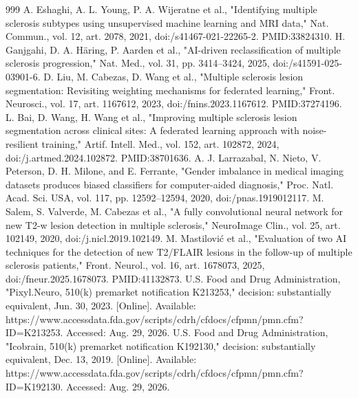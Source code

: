 \documentclass[journal,twoside,web]{ieeecolor}
\begin{document}
\begin{thebibliography}{999}
 A. Eshaghi, A. L. Young, P. A. Wijeratne et al., "Identifying multiple sclerosis subtypes using unsupervised machine learning and MRI data," Nat. Commun., vol. 12, art. 2078, 2021, doi:/\allowbreak s41467-021-22265-2. PMID:33824310.
 H. Ganjgahi, D. A. Häring, P. Aarden et al., "AI-driven reclassification of multiple sclerosis progression," Nat. Med., vol. 31, pp. 3414--3424, 2025, doi:/\allowbreak s41591-025-03901-6.
 D. Liu, M. Cabezas, D. Wang et al., "Multiple sclerosis lesion segmentation: Revisiting weighting mechanisms for federated learning," Front. Neurosci., vol. 17, art. 1167612, 2023, doi:/\allowbreak fnins.2023.1167612. PMID:37274196.
 L. Bai, D. Wang, H. Wang et al., "Improving multiple sclerosis lesion segmentation across clinical sites: A federated learning approach with noise-resilient training," Artif. Intell. Med., vol. 152, art. 102872, 2024, doi:/\allowbreak j.artmed.2024.102872. PMID:38701636.
 A. J. Larrazabal, N. Nieto, V. Peterson, D. H. Milone, and E. Ferrante, "Gender imbalance in medical imaging datasets produces biased classifiers for computer-aided diagnosis," Proc. Natl. Acad. Sci. USA, vol. 117, pp. 12592--12594, 2020, doi:/\allowbreak pnas.1919012117.
 M. Salem, S. Valverde, M. Cabezas et al., "A fully convolutional neural network for new T2-w lesion detection in multiple sclerosis," NeuroImage Clin., vol. 25, art. 102149, 2020, doi:/\allowbreak j.nicl.2019.102149.
 M. Mastilović et al., "Evaluation of two AI techniques for the detection of new T2/\allowbreak FLAIR lesions in the follow-up of multiple sclerosis patients," Front. Neurol., vol. 16, art. 1678073, 2025, doi:/\allowbreak fneur.2025.1678073. PMID:41132873.
 U.S. Food and Drug Administration, "Pixyl.Neuro, 510(k) premarket notification K213253," decision: substantially equivalent, Jun. 30, 2023. [Online]. Available: https:/\allowbreak /\allowbreak \allowbreak www.accessdata.fda.gov/\allowbreak scripts/\allowbreak cdrh/\allowbreak cfdocs/\allowbreak cfpmn/\allowbreak pmn.cfm?ID=K213253. Accessed: Aug. 29, 2026.
 U.S. Food and Drug Administration, "Icobrain, 510(k) premarket notification K192130," decision: substantially equivalent, Dec. 13, 2019. [Online]. Available: https:/\allowbreak /\allowbreak \allowbreak www.accessdata.fda.gov/\allowbreak scripts/\allowbreak cdrh/\allowbreak cfdocs/\allowbreak cfpmn/\allowbreak pmn.cfm?ID=K192130. Accessed: Aug. 29, 2026.

\end{thebibliography}
\end{document}
